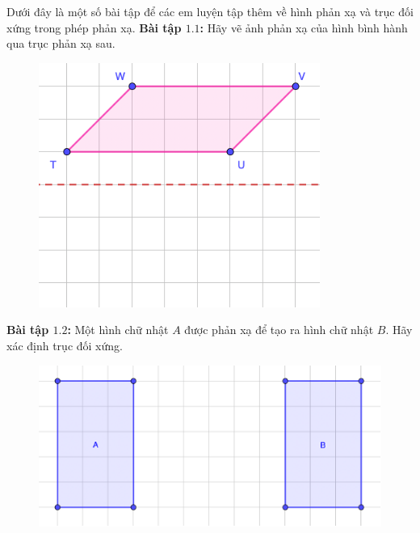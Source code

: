 \begin{multicols}{2}
\begin{figure}[H]
		\vspace*{-10pt}
	\end{figure}
	Dưới đây là một số bài tập để các em luyện tập thêm về hình phản xạ và trục đối xứng trong phép phản xạ.
	\vskip 0.1cm
	\textbf{\color{toancuabi}Bài tập $\pmb{1.1}$:} Hãy vẽ ảnh phản xạ của hình bình hành qua trục phản xạ sau.
	\begin{figure}[H]
		\vspace*{-5pt}
		\centering
		\captionsetup{labelformat= empty, justification=centering}
		\includegraphics[width= 1\linewidth]{Picture6}
		\vspace*{-10pt}
	\end{figure}
	\textbf{\color{toancuabi}Bài tập $\pmb{1.2}$:} Một hình chữ nhật $A$ được phản xạ để tạo ra hình chữ nhật $B$. Hãy xác định trục đối xứng.
	\begin{figure}[H]
		\vspace*{-5pt}
		\centering
		\captionsetup{labelformat= empty, justification=centering}
		\includegraphics[width= 1\linewidth]{Picture7}

\end{figure}
\end{multicols}

